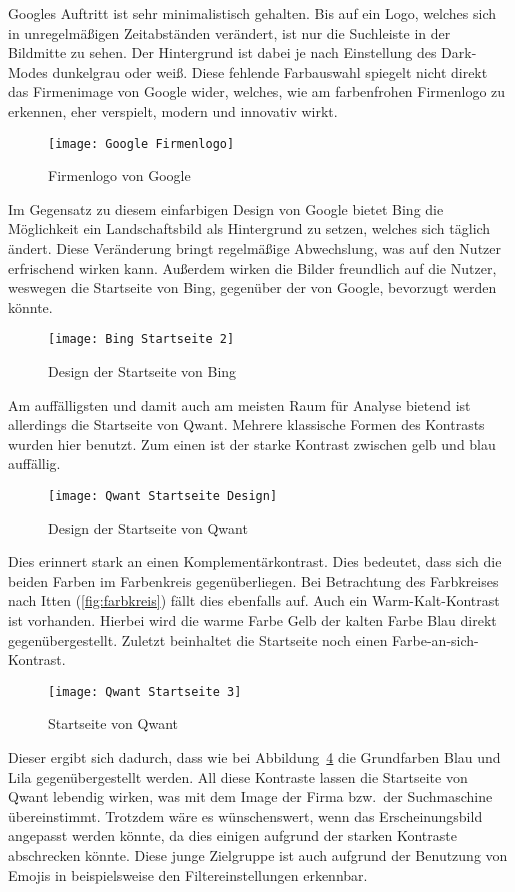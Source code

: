 Googles Auftritt ist sehr minimalistisch gehalten.
Bis auf ein Logo, welches sich in unregelmäßigen Zeitabständen verändert,
ist nur die Suchleiste in der Bildmitte zu sehen.
Der Hintergrund ist dabei je nach Einstellung des Dark-Modes dunkelgrau oder weiß.
Diese fehlende Farbauswahl spiegelt nicht direkt das Firmenimage von Google wider, welches, wie am farbenfrohen
Firmenlogo zu erkennen, eher verspielt, modern und innovativ wirkt.
\begin{figure}[ht]
    \centering
    \texttt{[image: Google Firmenlogo]}
    \caption{Firmenlogo von Google\autocite{.2020}}\label{fig:figure4}
\end{figure}

Im Gegensatz zu diesem einfarbigen Design von Google bietet Bing die Möglichkeit ein Landschaftsbild als Hintergrund zu
setzen, welches sich täglich ändert.
Diese Veränderung bringt regelmäßige Abwechslung, was auf den Nutzer erfrischend wirken kann.
Außerdem wirken die Bilder freundlich auf die Nutzer, weswegen die Startseite von Bing, gegenüber der von Google,
bevorzugt werden könnte.
\begin{figure}[ht]
    \centering
    \texttt{[image: Bing Startseite 2]}
    \caption{Design der Startseite von Bing}\label{fig:figure5}
\end{figure}

Am auffälligsten und damit auch am meisten Raum für Analyse bietend ist allerdings die Startseite von Qwant. Mehrere
klassische Formen des Kontrasts wurden hier benutzt.
Zum einen ist der starke Kontrast zwischen gelb und blau auffällig.
\begin{figure}[ht]
    \centering
    \texttt{[image: Qwant Startseite Design]}
    \caption{Design der Startseite von Qwant}\label{fig:figure6}
\end{figure}
Dies erinnert stark an einen Komplementärkontrast.
Dies bedeutet, dass sich die beiden Farben im Farbenkreis gegenüberliegen\autocite[Seite 33]{Maulhardt.20220513}.
Bei Betrachtung des Farbkreises nach Itten (\ref{fig:farbkreis}) fällt dies ebenfalls auf.
Auch ein Warm-Kalt-Kontrast ist vorhanden. Hierbei wird die warme Farbe Gelb der kalten Farbe Blau direkt gegenübergestellt\autocite[Seite 34]{Maulhardt.20220513}.
Zuletzt beinhaltet die Startseite noch einen Farbe-an-sich-Kontrast.
\begin{figure}[ht]
    \centering
    \texttt{[image: Qwant Startseite 3]}
    \caption{Startseite von Qwant}
    \label{fig:qwantstartseite3}
\end{figure}
Dieser ergibt sich dadurch,
dass wie bei Abbildung~\ref{fig:qwantstartseite3} die Grundfarben Blau und Lila gegenübergestellt werden\autocite[Seite 38]{Maulhardt.20220513}.
All diese Kontraste lassen die Startseite von Qwant lebendig wirken, was mit dem Image der Firma bzw.\ der Suchmaschine übereinstimmt.
Trotzdem wäre es wünschenswert, wenn das Erscheinungsbild angepasst werden könnte, da dies einigen aufgrund der starken
Kontraste abschrecken könnte.
Diese junge Zielgruppe ist auch aufgrund der Benutzung von Emojis in beispielsweise den
Filtereinstellungen erkennbar.

